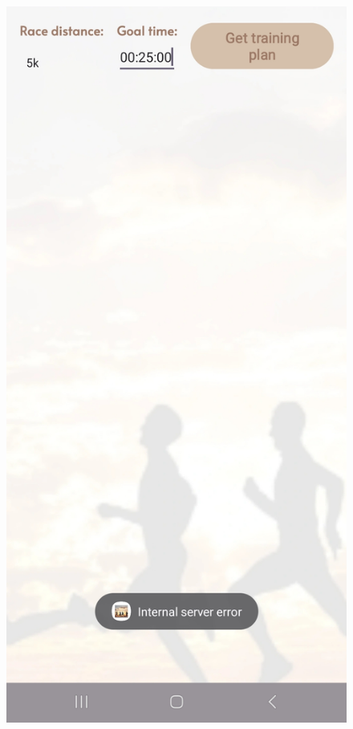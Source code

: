 \documentclass[12pt,oneside]{memoir}
\begin{document}
\begin{figure}[H]
  \centering
  \begin{minipage}{0.45\textwidth}
    \centering
  \includegraphics[scale=0.14]{assets/pictures/errors/500_server_error.jpg}

\end{minipage}
\end{figure}
\end{document}
